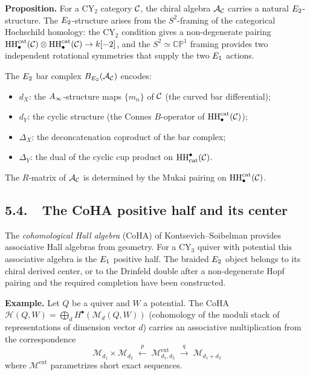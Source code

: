 \medskip
\noindent\textbf{Proposition}\textbf{.}\;
For a CY$_2$ category $\mathcal{C}$, the chiral algebra $\mathcal{A}_{\mathcal{C}}$ carries a
natural $E_2$-structure. The $E_2$-structure arises from the
$S^2$-framing of the categorical Hochschild homology: the CY$_2$ condition gives a
non-degenerate pairing $\mathrm{HH}^{\mathrm{cat}}_\bullet(\mathcal{C}) \otimes \mathrm{HH}^{\mathrm{cat}}_\bullet(\mathcal{C}) \to
k[-2]$, and the $S^2 \simeq \mathbb{CP}^1$ framing provides two
independent rotational symmetries that supply the two $E_1$ actions.

The $E_2$ bar complex $B_{E_2}(\mathcal{A}_{\mathcal{C}})$ encodes:
\begin{itemize}
 \item $d_X$: the $A_\infty$-structure maps $\{m_n\}$ of $\mathcal{C}$
 (the curved bar differential);
\item $d_Y$: the cyclic structure (the Connes $B$-operator of
 $\mathrm{HH}^{\mathrm{cat}}_\bullet(\mathcal{C})$);
 \item $\Delta_X$: the deconcatenation coproduct of the bar complex;
\item $\Delta_Y$: the dual of the cyclic cup product on
 $\mathrm{HH}^\bullet_{\mathrm{cat}}(\mathcal{C})$.
\end{itemize}
The $R$-matrix of $\mathcal{A}_{\mathcal{C}}$ is determined by the Mukai pairing on
$\mathrm{HH}^{\mathrm{cat}}_\bullet(\mathcal{C})$.

\subsection*{5.4.\ \ The CoHA positive half and its center}

The \emph{cohomological Hall algebra} (CoHA) of Kontsevich--Soibelman
provides associative Hall algebras from geometry. For a CY$_3$
quiver with potential this associative algebra is the $E_1$ positive
half. The braided $E_2$ object belongs to its chiral derived center,
or to the Drinfeld double after a non-degenerate Hopf pairing and the
required completion have been constructed.

\medskip
\noindent\textbf{Example}\textbf{.}\;
Let $Q$ be a quiver and $W$ a potential. The CoHA
$\mathcal{H}(Q, W) = \bigoplus_{d} H^\bullet(\mathcal{M}_d(Q, W))$
(cohomology of the moduli stack of representations of dimension
vector $d$) carries an associative multiplication from the
correspondence
\[
 \mathcal{M}_{d_1} \times \mathcal{M}_{d_2}
 \;\xleftarrow{\;p\;}\;
 \mathcal{M}_{d_1, d_2}^{\mathrm{ext}}
 \;\xrightarrow{\;q\;}\;
 \mathcal{M}_{d_1 + d_2}
\]
where $\mathcal{M}^{\mathrm{ext}}$ parametrizes short exact sequences.

